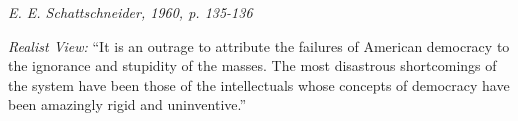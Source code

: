 \documentclass[12pt]{article}
\begin{document}
\hfill 

\textit{E. E. Schattschneider, 1960, p. 135-136}

\textit{Realist View:} ``It is an outrage to attribute the failures of American democracy to the ignorance and stupidity of the masses. The most disastrous shortcomings of the system have been those of the intellectuals whose concepts of democracy have been amazingly rigid and uninventive.'' 




\clearpage  %
\printindex %
\end{document}
